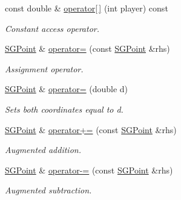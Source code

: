 \begin{DoxyCompactItemize}
const double \& \hyperlink{classSGPoint_a7aab30d800bf16c973379589916c87b4}{operator\mbox{[}$\,$\mbox{]}} (int player) const
\begin{DoxyCompactList}\small\item\em Constant access operator. \end{DoxyCompactList}\item 
\mbox{\label{classSGPoint_aedf45913c65b31cf7363f428cbe17087}} 
\hyperlink{classSGPoint}{S\+G\+Point} \& \hyperlink{classSGPoint_aedf45913c65b31cf7363f428cbe17087}{operator=} (const \hyperlink{classSGPoint}{S\+G\+Point} \&rhs)
\begin{DoxyCompactList}\small\item\em Assignment operator. \end{DoxyCompactList}\item 
\mbox{\label{classSGPoint_a1766a2ef73345b9017c214c7eeed6b7e}} 
\hyperlink{classSGPoint}{S\+G\+Point} \& \hyperlink{classSGPoint_a1766a2ef73345b9017c214c7eeed6b7e}{operator=} (double d)
\begin{DoxyCompactList}\small\item\em Sets both coordinates equal to d. \end{DoxyCompactList}\item 
\mbox{\label{classSGPoint_a65eb9c1b564b55fadcae4e5a0b75c7a4}} 
\hyperlink{classSGPoint}{S\+G\+Point} \& \hyperlink{classSGPoint_a65eb9c1b564b55fadcae4e5a0b75c7a4}{operator+=} (const \hyperlink{classSGPoint}{S\+G\+Point} \&rhs)
\begin{DoxyCompactList}\small\item\em Augmented addition. \end{DoxyCompactList}\item 
\mbox{\label{classSGPoint_aef6456278892c01cd4ef0881f10d2082}} 
\hyperlink{classSGPoint}{S\+G\+Point} \& \hyperlink{classSGPoint_aef6456278892c01cd4ef0881f10d2082}{operator-\/=} (const \hyperlink{classSGPoint}{S\+G\+Point} \&rhs)
\begin{DoxyCompactList}\small\item\em Augmented subtraction. \end{DoxyCompactList}\item 
\mbox{\label{classSGPoint_a782b0dfeaa473a82e5285d93084380e8}} 

\end{DoxyCompactItemize}
